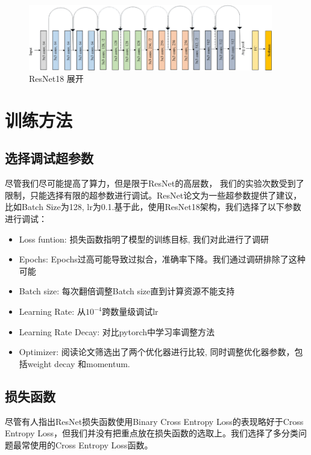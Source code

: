 \documentclass[hyperref, UTF8, 12pt]{article}
\theoremstyle{definition}
\begin{document}
\begin{figure}[h] %
	\centering %
	\includegraphics[width=0.95\textwidth]{resnet18.png} %
	\caption{ResNet18 展开} %
	\label{Fig.resnet3} %
\end{figure}


\section{训练方法}
\subsection{选择调试超参数}
尽管我们尽可能提高了算力，但是限于ResNet的高层数， 我们的实验次数受到了限制，只能选择有限的超参数进行调试。ResNet论文\cite{he2015deep}为一些超参数提供了建议，比如Batch Size为128, lr为0.1.基于此，使用ResNet18架构，我们选择了以下参数进行调试：
\begin{itemize}
	\item Loss funtion: 损失函数指明了模型的训练目标, 我们对此进行了调研
	\item Epochs: Epochs过高可能导致过拟合，准确率下降。我们通过调研排除了这种可能
	\item Batch size: 每次翻倍调整Batch size直到计算资源不能支持
	\item Learning Rate: 从$10 ^ {-4}$跨数量级调试lr
	\item Learning Rate Decay: 对比pytorch中学习率调整方法
	\item Optimizer: 阅读论文筛选出了两个优化器进行比较, 同时调整优化器参数，包括weight decay 和momentum.
\end{itemize}

\subsection {损失函数}
尽管有人指出\cite{beyer2020imagenet}ResNet损失函数使用Binary Cross Entropy Loss的表现略好于Cross Entropy Loss，但我们并没有把重点放在损失函数的选取上。我们选择了多分类问题最常使用的Cross Entropy Loss函数。
\end{document}
